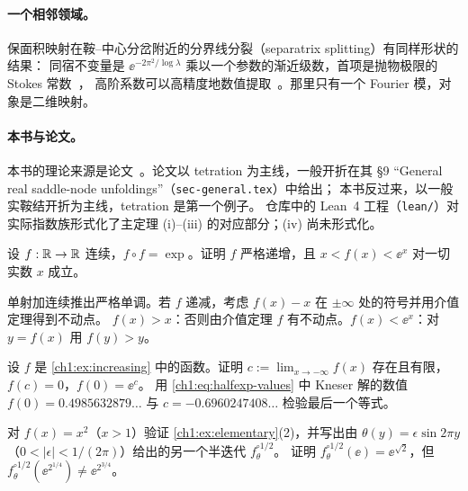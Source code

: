 \paragraph{一个相邻领域。}
保面积映射在鞍--中心分岔附近的分界线分裂（separatrix splitting）有同样形状的结果：
同宿不变量是 $\ee^{-2\pi^2/\log\lambda}$ 乘以一个参数的渐近级数，首项是抛物极限的 Stokes 常数~\cite{GelfreichBrannstrom,GelfreichSauzin2001}，
高阶系数可以高精度地数值提取~\cite{GelfreichSimo2008}。那里只有一个 Fourier 模，对象是二维映射。

\paragraph{本书与论文。}
本书的理论来源是论文~\cite{KneserPaper}。论文以 tetration 为主线，一般开折在其 \S9 ``General real saddle-node unfoldings''（\texttt{sec-general.tex}）中给出；
本书反过来，以一般实鞍结开折为主线，tetration 是第一个例子。
仓库中的 Lean~4 工程（\texttt{lean/}）对实际指数族形式化了主定理 (i)--(iii) 的对应部分；(iv) 尚未形式化。

\exercises

\begin{exercise}\label{ch1:ex:increasing}
设 $f:\mathbb{R}\to\mathbb{R}$ 连续，$f\circ f=\exp$。证明 $f$ 严格递增，且 $x<f(x)<\ee^x$ 对一切实数 $x$ 成立。
\end{exercise}
\begin{hint}
单射加连续推出严格单调。若 $f$ 递减，考虑 $f(x)-x$ 在 $\pm\infty$ 处的符号并用介值定理得到不动点。
$f(x)>x$：否则由介值定理 $f$ 有不动点。$f(x)<\ee^x$：对 $y=f(x)$ 用 $f(y)>y$。
\end{hint}

\begin{exercise}\label{ch1:ex:asymptote}
设 $f$ 是 \cref{ch1:ex:increasing} 中的函数。证明 $c:=\lim_{x\to-\infty}f(x)$ 存在且有限，$f(c)=0$，$f(0)=\ee^{c}$。
用 \eqref{ch1:eq:halfexp-values} 中 Kneser 解的数值 $f(0)=0.4985632879\ldots$ 与 $c=-0.6960247408\ldots$ 检验最后一个等式。
\end{exercise}

\begin{exercise}
对 $f(x)=x^2$（$x>1$）验证 \cref{ch1:ex:elementary}(2)，并写出由 $\theta(y)=\epsilon\sin2\pi y$（$0<|\epsilon|<1/(2\pi)$）给出的另一个半迭代 $f_\theta^{\circ1/2}$。
证明 $f_\theta^{\circ1/2}(\ee)=\ee^{\sqrt2}$，但 $f_\theta^{\circ1/2}(\ee^{2^{1/4}})\ne\ee^{2^{3/4}}$。
\end{exercise}

